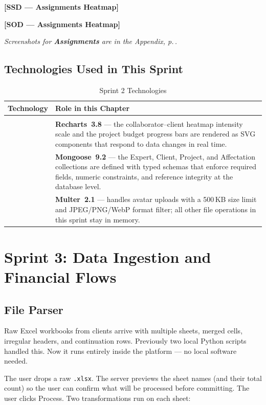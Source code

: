 \documentclass[12pt,a4paper]{report}
\newcommand{\ssd}[1]{\begin{placeholder}\textbf{[SSD --- #1]}\end{placeholder}\vspace{2pt}}
\newcommand{\sod}[1]{\begin{placeholder}\textbf{[SOD --- #1]}\end{placeholder}\vspace{4pt}}
\newcommand{\annexref}[1]{\begin{screenshotbox}\small\textit{Screenshots for \textbf{#1} are in the Appendix, p.\,\pageref{annex:#1}.}\end{screenshotbox}\vspace{4pt}}
\newcommand{\logoplace}[1]{%
  \begin{tikzpicture}[baseline=-0.5ex]
    \node[fill=logobg, draw=logoborder, rounded corners=4pt,
          inner xsep=6pt, inner ysep=4pt,
          minimum width=2.4cm, minimum height=0.75cm,
          font=\bfseries\footnotesize\color{accentgray}] {#1};
  \end{tikzpicture}%
}
\newenvironment{techtable}[2]{%
  \begin{longtable}{>{\centering\arraybackslash}p{2.6cm} p{11cm}}
  \caption{#1}\label{#2}\\
  \toprule\textbf{Technology} & \textbf{Role in this Chapter}\\\midrule\endhead
  \midrule\multicolumn{2}{r}{\small\itshape Continued\ldots}\\\endfoot
  \bottomrule\endlastfoot
}{%
  \end{longtable}%
}
\begin{document}
\ssd{Assignments Heatmap}
\sod{Assignments Heatmap}
\annexref{Assignments}

\section{Technologies Used in This Sprint}

\begin{techtable}{Sprint 2 Technologies}{tab:tech-sprint2}

  \logoplace{Recharts 3.8} &
  \textbf{Recharts~3.8} --- the collaborator--client heatmap intensity scale and the
  project budget progress bars are rendered as SVG components that respond to data
  changes in real time.\\[6pt]

  \logoplace{Mongoose 9.2} &
  \textbf{Mongoose~9.2} --- the Expert, Client, Project, and Affectation collections
  are defined with typed schemas that enforce required fields, numeric constraints, and
  reference integrity at the database level.\\[6pt]

  \logoplace{Multer 2.1} &
  \textbf{Multer~2.1} --- handles avatar uploads with a 500\,KB size limit and
  JPEG/PNG/WebP format filter; all other file operations in this sprint stay in memory.\\

\end{techtable}

\chapter{Sprint 3: Data Ingestion and Financial Flows}

\section{File Parser}

Raw Excel workbooks from clients arrive with multiple sheets, merged cells, irregular
headers, and continuation rows. Previously two local Python scripts handled this.
Now it runs entirely inside the platform --- no local software needed.

The user drops a raw \texttt{.xlsx}. The server previews the sheet names (and
their total count) so the user can confirm what will be processed before
committing. The user clicks Process. Two transformations run on each sheet:
\end{document}
